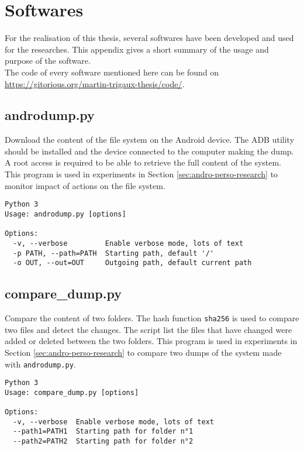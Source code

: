 
\chapter{Softwares}
\label{chap:app-soft}

For the realisation of this thesis, several softwares have been developed and used for the researches.
This appendix gives a short summary of the usage and purpose of the software.\\

The code of every software mentioned here can be found on \url{https://gitorious.org/martin-trigaux-thesis/code/}.


\section{androdump.py}

Download the content of the file system on the Android device.
The ADB utility should be installed and the device connected to the computer making the dump.
A root access is required to be able to retrieve the full content of the system.
This program is used in experiments in Section \ref{sec:andro-perso-research} to monitor impact of actions on the file system.

\begin{verbatim}
Python 3
Usage: androdump.py [options]

Options:
  -v, --verbose         Enable verbose mode, lots of text
  -p PATH, --path=PATH  Starting path, default '/'
  -o OUT, --out=OUT     Outgoing path, default current path
\end{verbatim}

\section{compare\_dump.py}

Compare the content of two folders.
The hash function \texttt{sha256} is used to compare two files and detect the changes.
The script list the files that have changed were added or deleted between the two folders.
This program is used in experiments in Section \ref{sec:andro-perso-research} to compare two dumps of the system made with \texttt{androdump.py}.

\begin{verbatim}
Python 3
Usage: compare_dump.py [options]

Options:
  -v, --verbose  Enable verbose mode, lots of text
  --path1=PATH1  Starting path for folder n°1
  --path2=PATH2  Starting path for folder n°2
\end{verbatim}

